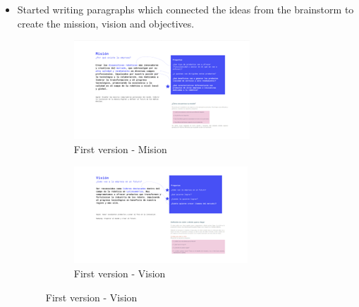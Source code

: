 \documentclass{article}
\begin{document}
\begin{itemize}
    \item Started writing paragraphs which connected the ideas from the brainstorm to create the mission, vision and objectives. 
    \begin{figure}[H]
        \centering
        \begin{subfigure}[b]{0.475\textwidth}
            \centering
            \includegraphics[width=\textwidth]{Images/Design/MisionV1.png}
            \caption[First version - Mision]%
            {{\small First version - Mision}}    
            
        \end{subfigure}
        \hfill
        \begin{subfigure}[b]{0.475\textwidth}  
            \centering 
            \includegraphics[width=\textwidth]{Images/Design/VisionV1.png}
            \caption[]%
            {{\small First version - Vision}}    
            

\end{subfigure}
\end{figure}
\end{itemize}
\end{document}
